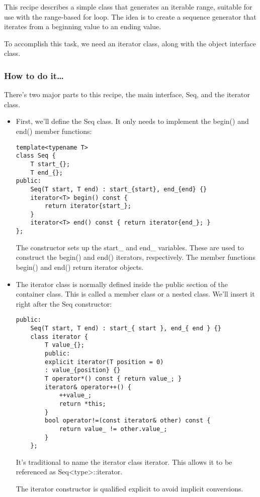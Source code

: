 
This recipe describes a simple class that generates an iterable range, suitable for use with the range-based for loop. The idea is to create a sequence generator that iterates from a beginning value to an ending value.

To accomplish this task, we need an iterator class, along with the object interface class.

\subsubsection{How to do it…}

There's two major parts to this recipe, the main interface, Seq, and the iterator class.

\begin{itemize}
\item 
First, we'll define the Seq class. It only needs to implement the begin() and end() member functions:

\begin{lstlisting}[style=styleCXX]
template<typename T>
class Seq {
	T start_{};
	T end_{};
public:
	Seq(T start, T end) : start_{start}, end_{end} {}
	iterator<T> begin() const {
		return iterator{start_};
	}
	iterator<T> end() const { return iterator{end_}; }
};
\end{lstlisting}

The constructor sets up the start\_ and end\_ variables. These are used to construct the begin() and end() iterators, respectively. The member functions begin() and end() return iterator objects.

\item 
The iterator class is normally defined inside the public section of the container class. This is called a member class or a nested class. We'll insert it right after the Seq constructor:

\begin{lstlisting}[style=styleCXX]
public:
	Seq(T start, T end) : start_{ start }, end_{ end } {}
	class iterator {
		T value_{};
		public:
		explicit iterator(T position = 0)
		: value_{position} {}
		T operator*() const { return value_; }
		iterator& operator++() {
			++value_;
			return *this;
		}
		bool operator!=(const iterator& other) const {
			return value_ != other.value_;
		}
	};
\end{lstlisting}

It's traditional to name the iterator class iterator. This allows it to be referenced as Seq<type>::iterator.

The iterator constructor is qualified explicit to avoid implicit conversions.


\end{itemize}
